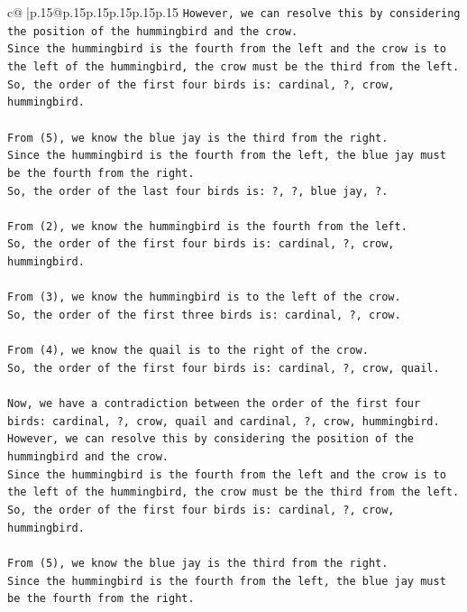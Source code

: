 \documentclass{article}
\begin{document}
{\begin{supertabular}{c@{$\;$}|p{.15\linewidth}@{}p{.15\linewidth}p{.15\linewidth}p{.15\linewidth}p{.15\linewidth}p{.15\linewidth}}
{{{\texttt{However, we can resolve this by considering the position of the hummingbird and the crow. } \\
\texttt{Since the hummingbird is the fourth from the left and the crow is to the left of the hummingbird, the crow must be the third from the left. } \\
\texttt{So, the order of the first four birds is: cardinal, ?, crow, hummingbird.} \\
\\ 
\texttt{From (5), we know the blue jay is the third from the right. } \\
\texttt{Since the hummingbird is the fourth from the left, the blue jay must be the fourth from the right. } \\
\texttt{So, the order of the last four birds is: ?, ?, blue jay, ?.} \\
\\ 
\texttt{From (2), we know the hummingbird is the fourth from the left. } \\
\texttt{So, the order of the first four birds is: cardinal, ?, crow, hummingbird.} \\
\\ 
\texttt{From (3), we know the hummingbird is to the left of the crow. } \\
\texttt{So, the order of the first three birds is: cardinal, ?, crow.} \\
\\ 
\texttt{From (4), we know the quail is to the right of the crow. } \\
\texttt{So, the order of the first four birds is: cardinal, ?, crow, quail.} \\
\\ 
\texttt{Now, we have a contradiction between the order of the first four birds: cardinal, ?, crow, quail and cardinal, ?, crow, hummingbird. } \\
\texttt{However, we can resolve this by considering the position of the hummingbird and the crow. } \\
\texttt{Since the hummingbird is the fourth from the left and the crow is to the left of the hummingbird, the crow must be the third from the left. } \\
\texttt{So, the order of the first four birds is: cardinal, ?, crow, hummingbird.} \\
\\ 
\texttt{From (5), we know the blue jay is the third from the right. } \\
\texttt{Since the hummingbird is the fourth from the left, the blue jay must be the fourth from the right. } \\
}}}
\end{supertabular}}
\end{document}
